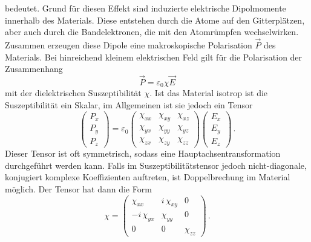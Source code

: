 bedeutet. 
Grund für diesen Effekt sind induzierte elektrische Dipolmomente innerhalb des Materials. Diese entstehen durch die Atome
auf den Gitterplätzen, aber auch durch die Bandelektronen, die mit den Atomrümpfen wechselwirken. Zusammen erzeugen diese
Dipole eine makroskopische Polarisation $\vec{P}$ des Materials. Bei hinreichend kleinem elektrischen Feld gilt für die 
Polarisation der Zusammenhang
\begin{equation}
    \label{eq:Pol}
    \vec{P} = \varepsilon_0 \chi \vec{E}
\end{equation}
mit der dielektrischen Suszeptibilität $\chi$. Ist das Material isotrop ist die Suszeptibilität ein Skalar, im Allgemeinen
ist sie jedoch ein Tensor
\begin{equation*}
    \begin{pmatrix}
        P_x \\
        P_y \\
        P_z
    \end{pmatrix}
    = \varepsilon_0 \begin{pmatrix}
        \chi_{xx} & \chi_{xy} & \chi_{xz} \\
        \chi_{yx} & \chi_{yy} & \chi_{yz} \\
        \chi_{zx} & \chi_{zy} & \chi_{zz}
    \end{pmatrix}
    \begin{pmatrix}
        E_x \\
        E_y \\
        E_z 
    \end{pmatrix} \, .
\end{equation*}
Dieser Tensor ist oft symmetrisch, sodass eine Hauptachsentransformation durchgeführt werden kann. Falls im Suszeptibilitätstensor
jedoch nicht-diagonale, konjugiert komplexe Koeffizienten auftreten, ist Doppelbrechung im Material möglich.
Der Tensor hat dann die Form 
\begin{equation}
    \label{eq:tensor}
    \chi
    = \begin{pmatrix}
        \chi_{xx} & i \, \chi_{xy} & 0 \\
        - i \, \chi_{yx} & \chi_{yy} & 0 \\
        0 & 0 & \chi_{zz}
    \end{pmatrix} \, .
\end{equation}
